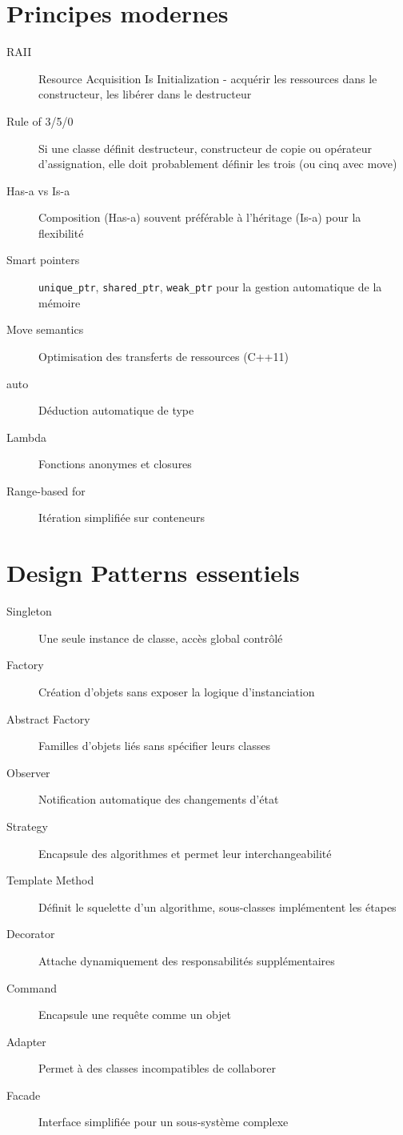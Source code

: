 \documentclass[9pt]{extarticle}
\begin{document}
\begin{multicols*}{3}
\section*{Principes modernes}
\begin{description}
\item[RAII] Resource Acquisition Is Initialization - acquérir les ressources dans le constructeur, les libérer dans le destructeur
\item[Rule of 3/5/0] Si une classe définit destructeur, constructeur de copie ou opérateur d'assignation, elle doit probablement définir les trois (ou cinq avec move)
\item[Has-a vs Is-a] Composition (Has-a) souvent préférable à l'héritage (Is-a) pour la flexibilité
\item[Smart pointers] \texttt{unique\_ptr}, \texttt{shared\_ptr}, \texttt{weak\_ptr} pour la gestion automatique de la mémoire
\item[Move semantics] Optimisation des transferts de ressources (C++11)
\item[auto] Déduction automatique de type
\item[Lambda] Fonctions anonymes et closures
\item[Range-based for] Itération simplifiée sur conteneurs
\end{description}

\section*{Design Patterns essentiels}
\begin{description}
\item[Singleton] Une seule instance de classe, accès global contrôlé
\item[Factory] Création d'objets sans exposer la logique d'instanciation
\item[Abstract Factory] Familles d'objets liés sans spécifier leurs classes
\item[Observer] Notification automatique des changements d'état
\item[Strategy] Encapsule des algorithmes et permet leur interchangeabilité
\item[Template Method] Définit le squelette d'un algorithme, sous-classes implémentent les étapes
\item[Decorator] Attache dynamiquement des responsabilités supplémentaires
\item[Command] Encapsule une requête comme un objet
\item[Adapter] Permet à des classes incompatibles de collaborer
\item[Facade] Interface simplifiée pour un sous-système complexe
\end{description}


\end{multicols*}
\end{document}
